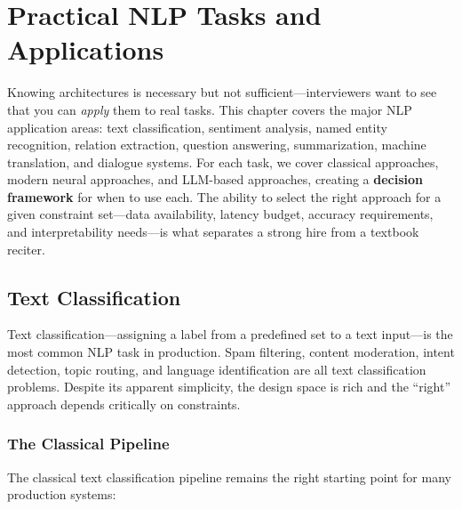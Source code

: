 
\chapter{Practical NLP Tasks and Applications}
\label{chap:practical_tasks}

\begin{tldr}
Knowing architectures is necessary but not sufficient---interviewers want to see that you can
\emph{apply} them to real tasks.  This chapter covers the major NLP application areas: text
classification, sentiment analysis, named entity recognition, relation extraction, question
answering, summarization, machine translation, and dialogue systems.  For each task, we cover
classical approaches, modern neural approaches, and LLM-based approaches, creating a
\textbf{decision framework} for when to use each.  The ability to select the right approach for a
given constraint set---data availability, latency budget, accuracy requirements, and
interpretability needs---is what separates a strong hire from a textbook reciter.
\end{tldr}

\section{Text Classification}
\label{sec:text_classification}

Text classification---assigning a label from a predefined set to a text input---is the most
common NLP task in production.  Spam filtering, content moderation, intent detection, topic
routing, and language identification are all text classification problems.  Despite its apparent
simplicity, the design space is rich and the ``right'' approach depends critically on
constraints.

\subsection{The Classical Pipeline}
\label{sec:classical_text_clf}

The classical text classification pipeline remains the right starting point for many production
systems:

